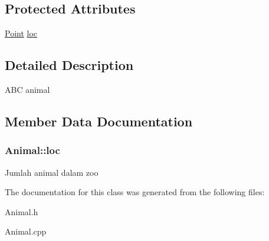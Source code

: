 \subsection*{Protected Attributes}
\begin{DoxyCompactItemize}
\item 
\hyperlink{classPoint}{Point} \hyperlink{classAnimal_a7f26dd7aa22ec6c003e0d564fb27baa3}{loc}
\end{DoxyCompactItemize}


\subsection{Detailed Description}
A\+BC animal 

\subsection{Member Data Documentation}
\subsubsection[{\texorpdfstring{loc}{loc}}]{ Animal\+::loc\hspace{0.3cm}{\ttfamily [protected]}}\hypertarget{classAnimal_a7f26dd7aa22ec6c003e0d564fb27baa3}{}\label{classAnimal_a7f26dd7aa22ec6c003e0d564fb27baa3}
Jumlah animal dalam zoo 

The documentation for this class was generated from the following files\+:\begin{DoxyCompactItemize}
\item 
Animal.\+h\item 
Animal.\+cpp\end{DoxyCompactItemize}
